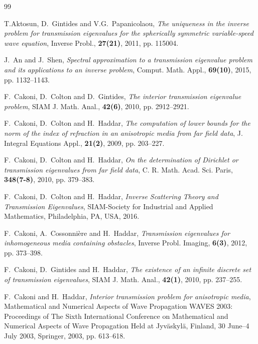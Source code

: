 \documentclass[11pt,reqno]{amsart}
\theoremstyle{definition}
\theoremstyle{remark}
\numberwithin{equation}{section}
\begin{document}
\begin{thebibliography}{99}	

    {T.Aktosun, D.~Gintides and V.G.~Papanicolaou},
    {\it The uniqueness in the inverse problem for transmission eigenvalues for the spherically symmetric variable-speed wave equation},
    Inverse Probl., \textbf{27(21)}, 2011, pp. 115004.

    {J.~An and J.~Shen},
    {\it Spectral approximation to a transmission eigenvalue problem and its applications to an inverse problem},
    Comput. Math. Appl., \textbf{69(10)}, 2015, pp. 1132--1143.

    {F.~Cakoni, D.~Colton and D.~Gintides},
    {\it The interior transmission eigenvalue problem},
    SIAM J. Math. Anal., \textbf{42(6)}, 2010, pp. 2912--2921.

    {F.~Cakoni, D.~Colton and H.~Haddar},
    {\it The computation of lower bounds for the norm of the index of refraction in an anisotropic media from far field data},
    J. Integral Equations Appl., \textbf{21(2)}, 2009, pp. 203--227.

    {F.~Cakoni, D.~Colton and H.~Haddar},
    {\it On the determination of {D}irichlet or transmission eigenvalues from far field data},
    C. R. Math. Acad. Sci. Paris, \textbf{348(7-8)}, 2010, pp. 379--383.

    {F.~Cakoni, D.~Colton and H.~Haddar},
    {\it Inverse Scattering Theory and Transmission Eigenvalues},
    SIAM-Society for Industrial and Applied Mathematics, Philadelphia, PA, USA, 2016.

    {F.~Cakoni, A.~Cossonni\`ere and H.~Haddar},
    {\it Transmission eigenvalues for inhomogeneous media containing obstacles},
    Inverse Probl. Imaging, \textbf{6(3)}, 2012, pp. 373--398.

    {F.~Cakoni, D.~Gintides and H.~Haddar},
    {\it The existence of an infinite discrete set of transmission eigenvalues},
    SIAM J. Math. Anal., \textbf{42(1)}, 2010, pp. 237--255.

    {F.~Cakoni and H.~Haddar},
    {\it Interior transmission problem for anisotropic media},
	Mathematical and Numerical Aspects of Wave Propagation WAVES 2003: Proceedings of The Sixth International Conference on Mathematical and Numerical Aspects of Wave Propagation Held at Jyv{\"a}skyl{\"a}, Finland, 30 June--4 July 2003, Springer, 2003, pp. 613--618.
	

\end{thebibliography}
\end{document}
